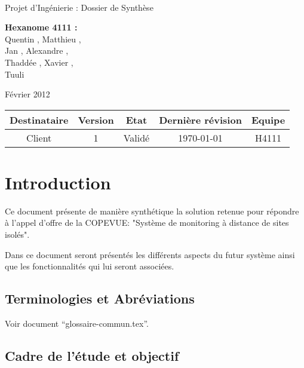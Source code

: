 \documentclass[a4paper]{article}
\begin{document}
\begin{titlepage}
~ 
\vfill
	\begin{center}
		\begin{Huge}
		Projet d'Ingénierie : Dossier de Synthèse\\
		\end{Huge} 
\vfill
		\textbf{Hexanome 4111 :} 
		\\Quentin {}, Matthieu , 
		\\Jan {}, Alexandre , 
		\\Thaddée , Xavier ,
		\\Tuuli {}
\vfill		
		\begin{Large}
		Février 2012
		\end{Large}
\vfill
	\begin{tabular}{|c|c|c|c|c|}
 	 \hline
   Destinataire & Version & Etat & Dernière révision & Equipe \\
   \hline
   Client & 1 & Validé & \today & H4111 \\
   \hline
	\end{tabular}
	\end{center}
\vfill
\end{titlepage}
\newpage
\tableofcontents
\newpage


\section{Introduction}

Ce document présente de manière synthétique la solution retenue pour répondre à l'appel d'offre de la COPEVUE: "Système de monitoring à distance de sites isolés".

Dans ce document seront présentés les différents aspects du futur système ainsi que les fonctionnalités qui lui seront associées.

\subsection{Terminologies et Abréviations}

Voir document ``glossaire-commun.tex''.

\subsection{Cadre de l’étude et objectif}
\end{document}
